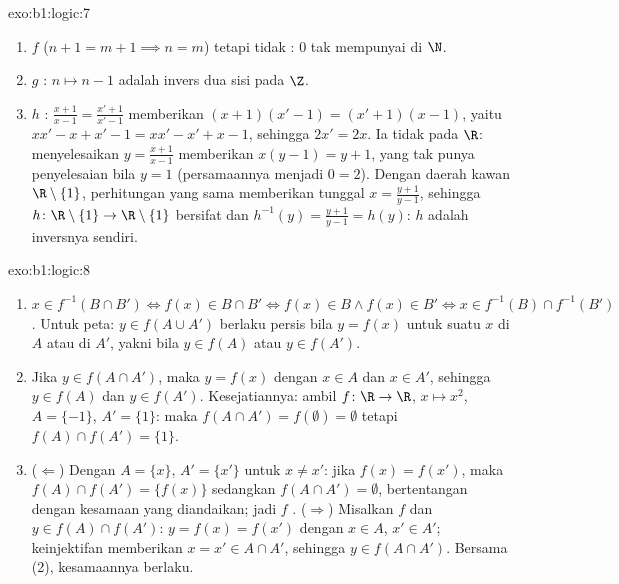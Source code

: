 \begin{solution}{exo:b1:logic:7}
\begin{enumerate}
  \item $f$  ($n + 1 = m + 1 \implies n = m$) tetapi tidak
        : $0$ tak mempunyai  di $\N$.
  \item $g$ : $n \mapsto n - 1$ adalah invers dua sisi pada
        $\Z$.
  \item $h$ : $\frac{x+1}{x-1} = \frac{x'+1}{x'-1}$ memberikan
        $(x+1)(x'-1) = (x'+1)(x-1)$, yaitu $xx' - x + x' - 1 = xx' -
        x' + x - 1$, sehingga $2x' = 2x$. Ia tidak  pada $\R$:
        menyelesaikan $y = \frac{x+1}{x-1}$ memberikan $x(y - 1) = y + 1$,
        yang tak punya penyelesaian bila $y = 1$ (persamaannya menjadi
        $0 = 2$). Dengan daerah kawan $\R \setminus \{1\}$, perhitungan
        yang sama memberikan  tunggal $x = \frac{y+1}{y-1}$, sehingga
        $h \colon \R \setminus \{1\} \to \R \setminus \{1\}$ bersifat
         dan $h^{-1}(y) = \frac{y+1}{y-1} = h(y)$: $h$ adalah
        inversnya sendiri.
\end{enumerate}
\end{solution}

\begin{solution}{exo:b1:logic:8}
\begin{enumerate}
  \item $x \in f^{-1}(B \cap B') \iff f(x) \in B \cap B' \iff f(x) \in
        B \land f(x) \in B' \iff x \in f^{-1}(B) \cap f^{-1}(B')$.
        Untuk peta: $y \in f(A \cup A')$ berlaku persis bila $y = f(x)$ untuk suatu $x$
        di $A$ atau di $A'$, yakni bila $y \in f(A)$ atau $y \in f(A')$.
  \item Jika $y \in f(A \cap A')$, maka $y = f(x)$ dengan $x \in A$ dan
        $x \in A'$, sehingga $y \in f(A)$ dan $y \in f(A')$. Kesejatiannya:
        ambil $f \colon \R \to \R$, $x \mapsto x^2$, $A = \{-1\}$,
        $A' = \{1\}$: maka $f(A \cap A') = f(\emptyset) = \emptyset$
        tetapi $f(A) \cap f(A') = \{1\}$.
  \item ($\Leftarrow$) Dengan $A = \{x\}$, $A' = \{x'\}$ untuk $x \neq
        x'$: jika $f(x) = f(x')$, maka $f(A) \cap f(A') = \{f(x)\}$
        sedangkan $f(A \cap A') = \emptyset$, bertentangan dengan
        kesamaan yang diandaikan; jadi $f$ . ($\Rightarrow$) Misalkan $f$
         dan $y \in f(A) \cap f(A')$: $y = f(x) = f(x')$ dengan
        $x \in A$, $x' \in A'$; keinjektifan memberikan $x = x' \in A \cap
        A'$, sehingga $y \in f(A \cap A')$. Bersama (2), kesamaannya berlaku.
\end{enumerate}
\end{solution}

